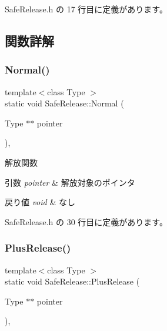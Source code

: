  Safe\+Release.\+h の 17 行目に定義があります。



\subsection{関数詳解}
\mbox{\label{class_safe_release_a6ecab682df939c28d8867a67c2f4b51f}} 
\subsubsection{\texorpdfstring{Normal()}{Normal()}}
{\footnotesize\ttfamily template$<$class Type $>$ \\
static void Safe\+Release\+::\+Normal (\begin{DoxyParamCaption}\item[{Type $\ast$$\ast$}]{pointer }\end{DoxyParamCaption})\hspace{0.3cm}{\ttfamily [inline]}, {\ttfamily [static]}}



解放関数 


\begin{DoxyParams}{引数}
{\em pointer} & 解放対象のポインタ \\
\hline
\end{DoxyParams}

\begin{DoxyRetVals}{戻り値}
{\em void} & なし \\
\hline
\end{DoxyRetVals}


 Safe\+Release.\+h の 30 行目に定義があります。

\mbox{\label{class_safe_release_a507950335a85da67c1722cce83dca9ae}} 
\subsubsection{\texorpdfstring{Plus\+Release()}{PlusRelease()}}
{\footnotesize\ttfamily template$<$class Type $>$ \\
static void Safe\+Release\+::\+Plus\+Release (\begin{DoxyParamCaption}\item[{Type $\ast$$\ast$}]{pointer }\end{DoxyParamCaption})\hspace{0.3cm}{\ttfamily [inline]}, {\ttfamily [static]}}



